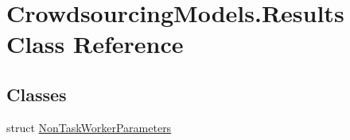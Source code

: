 \hypertarget{class_crowdsourcing_models_1_1_results}{}\section{Crowdsourcing\+Models.\+Results Class Reference}
\label{class_crowdsourcing_models_1_1_results}
\subsection*{Classes}
\begin{DoxyCompactItemize}
\item 
struct \hyperlink{struct_crowdsourcing_models_1_1_results_1_1_non_task_worker_parameters}{Non\+Task\+Worker\+Parameters}
\end{DoxyCompactItemize}
